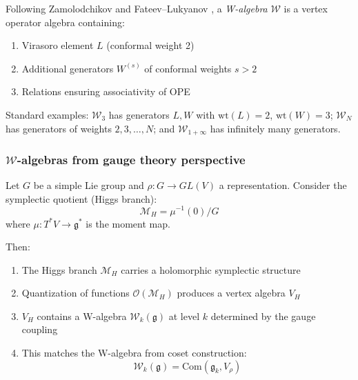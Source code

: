 \begin{definition}\label{def:w-algebra-cft}
Following Zamolodchikov \cite{Zamolodchikov} and Fateev--Lukyanov \cite{FL88}, a
\emph{W-algebra} $\mathcal{W}$ is a vertex operator algebra containing:
\begin{enumerate}
\item Virasoro element $L$ (conformal weight 2)
\item Additional generators $W^{(s)}$ of conformal weights $s > 2$
\item Relations ensuring associativity of OPE
\end{enumerate}
\end{definition}

Standard examples: $\mathcal{W}_3$ has generators $L, W$ with $\text{wt}(L) = 2$, $\text{wt}(W) = 3$; $\mathcal{W}_N$ has generators of weights $2, 3, \ldots, N$; and $\mathcal{W}_{1+\infty}$ has infinitely many generators.

\subsubsection{$\mathcal{W}$-algebras from gauge theory perspective}

\begin{theorem}\label{thm:w-from-gauge}
\cite{ACL19} Let $G$ be a simple Lie group and $\rho: G \to GL(V)$ a
representation. Consider the symplectic quotient (Higgs branch):
\[\mathcal{M}_H = \mu^{-1}(0) / G\]
where $\mu: T^*V \to \mathfrak{g}^*$ is the moment map.

Then:
\begin{enumerate}
\item The Higgs branch $\mathcal{M}_H$ carries a holomorphic symplectic structure

\item Quantization of functions $\mathcal{O}(\mathcal{M}_H)$ produces a vertex
 algebra $V_H$

\item $V_H$ contains a W-algebra $\mathcal{W}_k(\mathfrak{g})$ at level $k$
 determined by the gauge coupling

\item This matches the W-algebra from coset construction:
 \[\mathcal{W}_k(\mathfrak{g}) = \text{Com}(\mathfrak{g}_k, V_\rho)\]
\end{enumerate}
\end{theorem}


